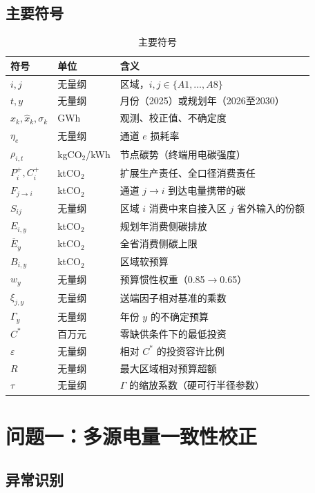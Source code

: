 \documentclass[UTF8,a4paper,zihao=-4,fontset=fandol]{ctexart}
\begin{document}
\subsection{主要符号}

\begin{table}[htbp]
\centering
\caption{主要符号}
\label{tab:symbol}
\begin{tabular}{llp{7.6cm}}
\toprule
符号 & 单位 & 含义 \\
\midrule
$i,j$ & 无量纲 & 区域，$i,j\in\{A1,\ldots,A8\}$ \\
$t,y$ & 无量纲 & 月份（2025）或规划年（2026至2030） \\
$x_k,\hat x_k,\sigma_k$ & GWh & 观测、校正值、不确定度 \\
$\eta_e$ & 无量纲 & 通道 $e$ 损耗率 \\
$\rho_{i,t}$ & kgCO$_2$/kWh & 节点碳势（终端用电碳强度） \\
$P^+_i,C^+_i$ & ktCO$_2$ & 扩展生产责任、全口径消费责任 \\
$F_{j\to i}$ & ktCO$_2$ & 通道 $j\to i$ 到达电量携带的碳 \\
$S_{ij}$ & 无量纲 & 区域 $i$ 消费中来自接入区 $j$ 省外输入的份额 \\
$E_{i,y}$ & ktCO$_2$ & 规划年消费侧碳排放 \\
$\overline E_y$ & ktCO$_2$ & 全省消费侧碳上限 \\
$B_{i,y}$ & ktCO$_2$ & 区域软预算 \\
$w_y$ & 无量纲 & 预算惯性权重（0.85$\to$0.65） \\
$\xi_{j,y}$ & 无量纲 & 送端因子相对基准的乘数 \\
$\Gamma_y$ & 无量纲 & 年份 $y$ 的不确定预算 \\
$C^*$ & 百万元 & 零缺供条件下的最低投资 \\
$\varepsilon$ & 无量纲 & 相对 $C^*$ 的投资容许比例 \\
$R$ & 无量纲 & 最大区域相对预算超额 \\
$\tau$ & 无量纲 & $\Gamma$ 的缩放系数（硬可行半径参数） \\
\bottomrule
\end{tabular}
\end{table}

\section{问题一：多源电量一致性校正}

\subsection{异常识别}
\end{document}
